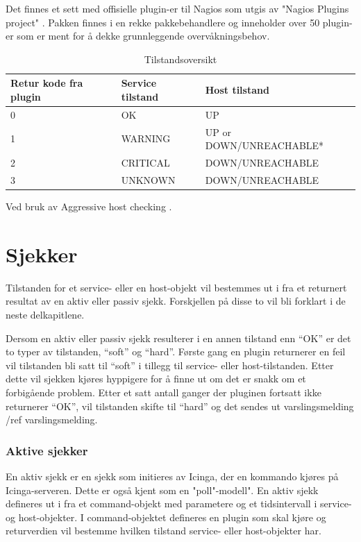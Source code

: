 Det finnes et sett med offisielle plugin-er til Nagios som utgis av "Nagios Plugins project" \cite{http://nagiosplugins.org}. Pakken finnes i en rekke pakkebehandlere og inneholder over 50 plugin-er som er ment for å dekke grunnleggende overvåkningsbehov.

\begin{table}
	\begin{center}
	\begin{threeparttable}
	\begin{tabular}{ | l | l | l |} \hline
    \textbf{Retur kode fra plugin} & \textbf{Service tilstand} & \textbf{Host tilstand} \\ \hline
	0 & OK & UP \\ \hline
	1 & WARNING & UP or DOWN/UNREACHABLE* \\ \hline
	2 & CRITICAL & DOWN/UNREACHABLE \\ \hline
	3 & UNKNOWN & DOWN/UNREACHABLE \\ \hline

	\end{tabular}
	\begin{tablenotes}
	\small
	\item *Ved bruk av Aggressive host checking \cite{icingapluginapi}.
	\end{tablenotes}
	\caption{Tilstandsoversikt}
	\label{state}
	\end{threeparttable}
	\end{center}
\end{table}

\section{Sjekker}
Tilstanden for et service- eller en host-objekt vil bestemmes ut i fra et returnert resultat av en aktiv eller passiv sjekk. Forskjellen på disse to vil bli forklart i de neste delkapitlene.

Dersom en aktiv eller passiv sjekk resulterer i en annen tilstand enn “OK” er det to typer av tilstanden, “soft” og “hard”. Første gang en plugin returnerer en feil vil tilstanden bli satt til “soft” i tillegg til service- eller host-tilstanden. Etter dette vil sjekken kjøres hyppigere for å finne ut om det er snakk om et forbigående problem. Etter et satt antall ganger der pluginen fortsatt ikke returnerer “OK”, vil tilstanden skifte til “hard” og det sendes ut varslingsmelding /ref {varslingsmelding}.

\subsubsection{Aktive sjekker}
En aktiv sjekk er en sjekk som initieres av Icinga, der en kommando kjøres på Icinga-serveren. Dette er også kjent som en "poll"-modell". En aktiv sjekk defineres ut i fra et command-objekt med parametere og et tidsintervall i service- og host-objekter. I command-objektet defineres en plugin som skal kjøre og returverdien vil bestemme hvilken tilstand service- eller host-objekter har. 


